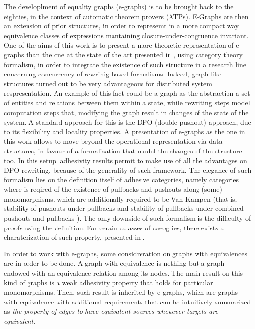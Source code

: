 The developlment of equality graphs (e-graphs) is to be brought back to the eighties, in the context of automatic theorem provers (ATPs). E-Graphs are then an extension of prior structures, in order to represemt in a more compact way equivalence classes of expressions mantaining closure-under-congruence invariant.
One of the aims of this work is to present a more theoretic representation of e-graphs than the one at the state of the art presented in \cite{egg}, using category theory formalism, in order to integrate the existence of such structure in a research line concerning concurrency of rewrinig-based formalisms.
Indeed, graph-like structures turned out to be very advantageous for distributed system respresentation.
An example of this fact could be a graph as the abstraction a set of entities and relations between them within a state, while rewriting steps model computation steps that, modifying the graph result in changes of the state of the system.
A standard approach for this is the DPO (double pushout) approach, due to its flexibility and locality properties.
A presentation of e-graphs as the one in this work allows to move beyond the operational representation via data structures, in favour of a formalization that model the changes of the structure too.
In this setup, adhesivity results permit to make use of all the advantages on DPO rewriting, because of the generality of such framework.
The elegance of such formalism lies on the definition itself of adhesive categories, namely categories where is reqired of the existence of pullbacks and pushouts along (some) monomorphisms, which are additionally required to be Van Kampen (that is, stability of pushouts under pullbacks and stability of pullbacks under combined pushouts and pullbacks \cite{Ehrig_Golas}).
The only downside of such formalism is the difficulty of proofs using the definition. For cerain calasses of caeogries, there exists a charaterization of such property, presented in \cite{castelnovo2022newcriterionmathcalmmathcalnadhesivity}.


In order to work with e-graphs, some considreration on graphs with equivalences are in order to be done. A graph with equivalence is nothing but a graph endowed with an equivalence relation among its nodes. The main result on this kind of graphs is a weak adhesivity property that holds for particular monomorphisms. Then, such result is inherited by e-graphs, which are graphs with equivalence with additional requirements that can be intuitively summarized as \textit{the property of edges to have equivalent sources whenever targets are equivalent}.

